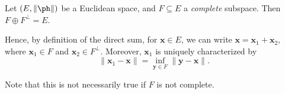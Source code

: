 \documentclass[a4paper]{article}
\begin{document}
\begin{thm}
  Let $(E, \|\ph\|)$ be a Euclidean space, and $F\subseteq E$ a \emph{complete} subspace. Then $F \oplus F^\perp = E$.

  Hence, by definition of the direct sum, for $\mathbf{x} \in E$, we can write $\mathbf{x} = \mathbf{x}_1 + \mathbf{x}_2$, where $\mathbf{x}_1 \in F$ and $\mathbf{x}_2 \in F^\perp$. Moreover, $\mathbf{x}_1$ is uniquely characterized by
  \[
    \|\mathbf{x}_1 - \mathbf{x}\| = \inf_{\mathbf{y} \in F} \|\mathbf{y\mathbf{}} - \mathbf{x}\|.
  \]
\end{thm}
\begin{center}
\end{center}
Note that this is not necessarily true if $F$ is not complete.
\end{document}
